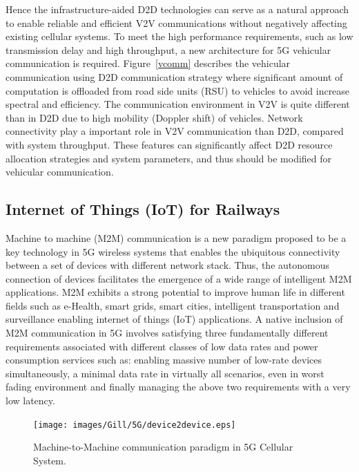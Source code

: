 Hence the infrastructure-aided D2D technologies can serve as a natural approach to enable reliable and efficient V2V communications without negatively affecting existing cellular systems. To meet the high performance requirements, such as low transmission delay and high throughput, a new architecture for 5G vehicular communication is required. Figure~\ref{vcomm} describes the vehicular communication  using D2D communication strategy where significant amount of computation is offloaded from road side units (RSU) to vehicles to avoid increase spectral and efficiency. The communication environment in V2V is quite different than in D2D due to high mobility (Doppler shift) of vehicles. Network connectivity play a important role in V2V communication than D2D, compared with system throughput. These features can significantly affect D2D resource allocation strategies and system parameters, and thus should be modified for vehicular communication.

\subsection{Internet of Things (IoT) for Railways}

Machine to machine (M2M) communication is a new paradigm proposed to be a key technology in 5G wireless systems that enables the ubiquitous connectivity  between a set  of devices  with different network stack.  Thus,  the  autonomous  connection  of  devices  facilitates  the  emergence  of  a  wide  range  of  intelligent M2M applications. M2M exhibits a strong potential to improve human life in different fields such as e-Health, smart  grids, smart cities, intelligent transportation and surveillance enabling internet of things (IoT) applications. A native inclusion of M2M communication in 5G involves satisfying three fundamentally different requirements associated with different classes of low data rates and power consumption services such as: enabling massive number of low-rate devices simultaneously, a minimal data rate in virtually all scenarios, even in worst fading environment and finally managing the above two requirements with a very low latency.


\begin{figure}[!ht]
	\centering
\texttt{[image: images/Gill/5G/device2device.eps]}
	\caption{Machine-to-Machine communication paradigm in 5G Cellular System.}
	\label{d2d}
\end{figure}

